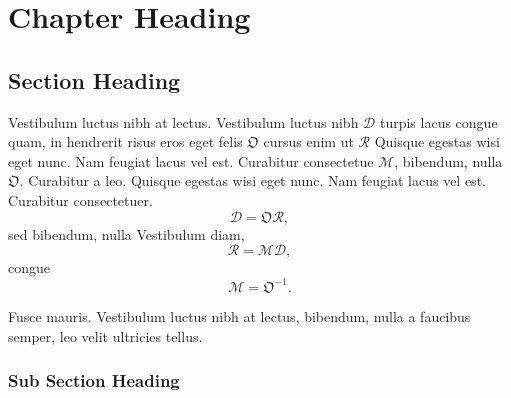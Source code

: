 \setcounter{chapter}{5}

%


\chapter{Chapter Heading}



\vspace*{3pc}

\section{Section Heading}

Vestibulum luctus nibh at lectus. Vestibulum luctus nibh ${\boldsymbol{\mathcal{D}}}$ turpis lacus congue quam, in hendrerit risus eros eget felis ${\boldsymbol{\mathfrak{O}}}$ cursus enim ut ${\boldsymbol{\mathcal{R}}}$ Quisque egestas wisi eget
nunc. Nam feugiat lacus vel est. Curabitur consectetue ${\boldsymbol{\mathcal{M}}}$, bibendum, nulla ${\boldsymbol{\mathfrak{O}}}$. Curabitur a leo. Quisque egestas wisi eget nunc. Nam feugiat lacus vel est. Curabitur consectetuer.
\begin{equation}{\boldsymbol{\mathcal{D}}}=\boldsymbol{\mathfrak{O} \mathcal{R}},\end{equation}
sed bibendum, nulla Vestibulum diam,
\begin{equation}{\boldsymbol{\mathcal{R}}}={\boldsymbol{\mathcal{M} \mathcal{D}}},\end{equation}
congue
\begin{equation}{\boldsymbol{\mathcal{M}}}=\boldsymbol{\mathfrak{O}}^{-1}.\end{equation}

Fusce mauris. Vestibulum luctus nibh at lectus, bibendum, nulla a faucibus semper,
leo velit ultricies tellus.

\subsection{Sub Section Heading}

